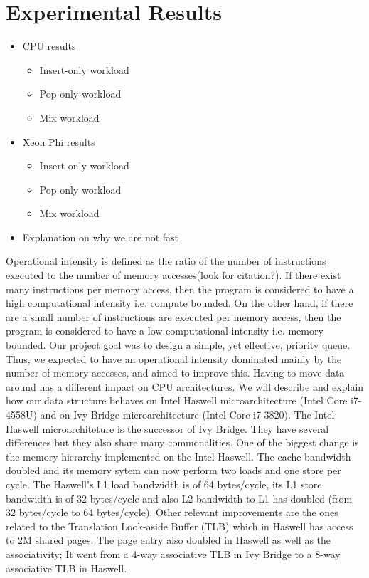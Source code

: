 \section{Experimental Results}\label{sec:exp}

\begin{itemize}
	\item CPU results
		\begin{itemize}
			\item Insert-only workload
			\item Pop-only workload
			\item Mix workload
		\end{itemize}
	\item Xeon Phi results
		\begin{itemize}
			\item Insert-only workload
			\item Pop-only workload
			\item Mix workload
		\end{itemize}
	\item Explanation on why we are not fast
\end{itemize}

Operational intensity is defined as the ratio of the number of instructions executed to the number of memory accesses(look for citation?). If there exist many instructions per memory access, then the program is considered to have a high computational intensity i.e. compute bounded. On the other hand, if there are a small number of instructions are executed per memory access, then the program is considered to have a low computational intensity i.e. memory bounded.
Our project goal was to design a simple, yet effective, priority queue. Thus, we expected to have an operational intensity dominated mainly by the number of memory accesses, and aimed to improve this. Having to move data around has a different impact on CPU architectures. We will describe and explain how our data structure behaves on Intel Haswell microarchitecture (Intel Core i7-4558U) and on Ivy Bridge microarchitecture (Intel Core i7-3820).
The Intel Haswell microarchiteture is the successor of Ivy Bridge. They have several differences but they also share many commonalities. One of the biggest change is the memory hierarchy implemented on the Intel Haswell. The cache bandwidth doubled and its memory sytem can now perform two loads and one store per cycle. The Haswell's L1 load bandwidth is of 64 bytes/cycle, its L1 store bandwidth is of 32 bytes/cycle and also L2 bandwidth to L1 has doubled (from 32 bytes/cycle to 64 bytes/cycle). Other relevant improvements are the ones related to the Translation Look-aside Buffer (TLB) which in Haswell has access to 2M shared pages. The page entry also doubled in Haswell as well as the associativity; It went from a 4-way associative TLB in Ivy Bridge to a 8-way associative TLB in Haswell.

